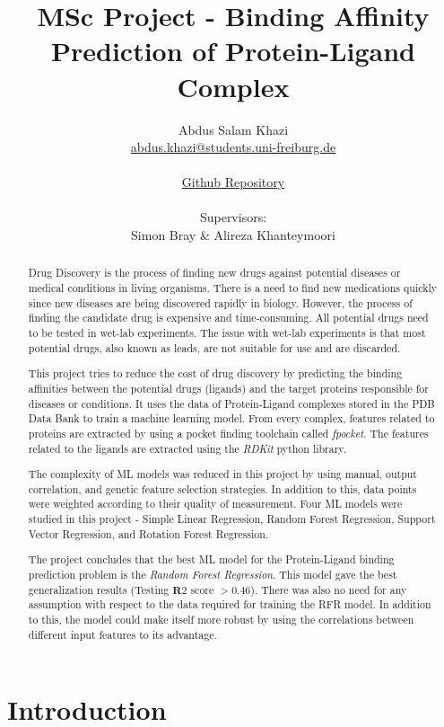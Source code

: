 \documentclass[11pt]{article}
\title{MSc Project - Binding Affinity Prediction of Protein-Ligand Complex}
\author{
        Abdus Salam Khazi\\
        \href{mailto:abdus.khazi@students.uni-freiburg.de}
                {abdus.khazi@students.uni-freiburg.de}\\ \\
        \href{https://github.com/abduskhazi/MSc-Project}
                {Github Repository} \cite{github_repository} \\ \\
        Supervisors:
        \begin{tabular}{ll}
			Simon Bray \&
			Alireza Khanteymoori
		\end{tabular}
       }
\begin{document}
\maketitle
\date{}
\tableofcontents
\newpage

\begin{abstract}

Drug Discovery is the process of finding new drugs against potential diseases or medical conditions in living organisms.
There is a need to find new medications quickly since new diseases are being discovered rapidly in biology.
However, the process of finding the candidate drug is expensive and time-consuming.
All potential drugs need to be tested in wet-lab experiments.
The issue with wet-lab experiments is that most potential drugs, also known as leads, are not suitable for use and are discarded.

This project tries to reduce the cost of drug discovery by predicting the binding affinities between the potential drugs (ligands) and the target proteins responsible for diseases or conditions.
It uses the data of Protein-Ligand complexes stored in the PDB Data Bank to train a machine learning model.
From every complex, features related to proteins are extracted by using a pocket finding toolchain called \textit{fpocket}. The features related to the ligands are extracted using the \textit{RDKit} python library.

The complexity of ML models was reduced in this project by using manual, output correlation, and genetic feature selection strategies.
In addition to this,  data points were weighted according to their quality of measurement.
Four ML models were studied in this project - Simple Linear Regression,  Random Forest Regression,  Support Vector Regression, and Rotation Forest Regression.

The project concludes that the best ML model for the Protein-Ligand binding prediction problem is the \textit{Random Forest Regression}.
This model gave the best generalization results (Testing $\mathbf{R}2$ score $> 0.46$).
There was also no need for any assumption with respect to the data required for training the RFR model.
In addition to this, the model could make itself more robust by using the correlations between different input features to its advantage.

\end{abstract}

\newpage

\section{Introduction}
\end{document}

